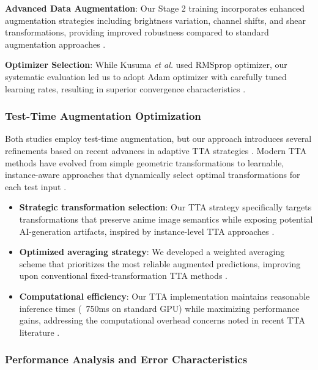 \documentclass{article}
\begin{document}
\textbf{Advanced Data Augmentation}: Our Stage 2 training incorporates enhanced augmentation strategies including brightness variation, channel shifts, and shear transformations, providing improved robustness compared to standard augmentation approaches \cite{kusuma2024detection}\cite{kusuma2024detection}.

\textbf{Optimizer Selection}: While Kusuma \textit{et al.} used RMSprop optimizer, our systematic evaluation led us to adopt Adam optimizer with carefully tuned learning rates, resulting in superior convergence characteristics \cite{kusuma2024detection}.

\subsubsection{Test-Time Augmentation Optimization}

Both studies employ test-time augmentation, but our approach introduces several refinements based on recent advances in adaptive TTA strategies \cite{wang2018test}\cite{kim2020learning}. Modern TTA methods have evolved from simple geometric transformations to learnable, instance-aware approaches that dynamically select optimal transformations for each test input \cite{wang2018test}.

\begin{itemize}
    \item \textbf{Strategic transformation selection}: Our TTA strategy specifically targets transformations that preserve anime image semantics while exposing potential AI-generation artifacts, inspired by instance-level TTA approaches \cite{wang2018test}.
    
    \item \textbf{Optimized averaging strategy}: We developed a weighted averaging scheme that prioritizes the most reliable augmented predictions, improving upon conventional fixed-transformation TTA methods \cite{kim2020learning}.
    
    \item \textbf{Computational efficiency}: Our TTA implementation maintains reasonable inference times (~750ms on standard GPU) while maximizing performance gains, addressing the computational overhead concerns noted in recent TTA literature \cite{wang2018test}.
\end{itemize}

\subsubsection{Performance Analysis and Error Characteristics}
\end{document}
